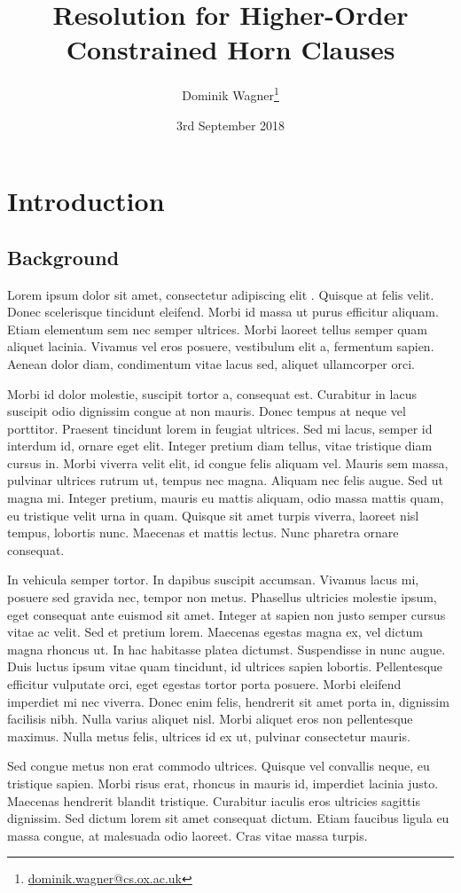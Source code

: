 \documentclass[a4paper,twoside,notitlepage,openright,11pt]{report}
\title{Resolution for Higher-Order\\Constrained Horn Clauses}
\author{Dominik Wagner\ifdraft\thanks{\href{mailto:dominik.wagner@cs.ox.ac.uk}{dominik.wagner@cs.ox.ac.uk}}\else\fi}
\date{3rd September 2018}
\begin{document}


\chapter{Introduction}
\section{Background}
\label{sec:background}


Lorem ipsum dolor sit amet, consectetur adipiscing elit \cite{C45}. Quisque at felis velit. Donec scelerisque tincidunt eleifend. Morbi id massa ut purus efficitur aliquam. Etiam elementum sem nec semper ultrices. Morbi laoreet tellus semper quam aliquet lacinia. Vivamus vel eros posuere, vestibulum elit a, fermentum sapien. Aenean dolor diam, condimentum vitae lacus sed, aliquet ullamcorper orci.

Morbi id dolor molestie, suscipit tortor a, consequat est. Curabitur in lacus suscipit odio dignissim congue at non mauris. Donec tempus at neque vel porttitor. Praesent tincidunt lorem in feugiat ultrices. Sed mi lacus, semper id interdum id, ornare eget elit. Integer pretium diam tellus, vitae tristique diam cursus in. Morbi viverra velit elit, id congue felis aliquam vel. Mauris sem massa, pulvinar ultrices rutrum ut, tempus nec magna. Aliquam nec felis augue. Sed ut magna mi. Integer pretium, mauris eu mattis aliquam, odio massa mattis quam, eu tristique velit urna in quam. Quisque sit amet turpis viverra, laoreet nisl tempus, lobortis nunc. Maecenas et mattis lectus. Nunc pharetra ornare consequat.

In vehicula semper tortor. In dapibus suscipit accumsan. Vivamus lacus mi, posuere sed gravida nec, tempor non metus. Phasellus ultricies molestie ipsum, eget consequat ante euismod sit amet. Integer at sapien non justo semper cursus vitae ac velit. Sed et pretium lorem. Maecenas egestas magna ex, vel dictum magna rhoncus ut. In hac habitasse platea dictumst. Suspendisse in nunc augue. Duis luctus ipsum vitae quam tincidunt, id ultrices sapien lobortis. Pellentesque efficitur vulputate orci, eget egestas tortor porta posuere. Morbi eleifend imperdiet mi nec viverra. Donec enim felis, hendrerit sit amet porta in, dignissim facilisis nibh. Nulla varius aliquet nisl. Morbi aliquet eros non pellentesque maximus. Nulla metus felis, ultrices id ex ut, pulvinar consectetur mauris.

Sed congue metus non erat commodo ultrices. Quisque vel convallis neque, eu tristique sapien. Morbi risus erat, rhoncus in mauris id, imperdiet lacinia justo. Maecenas hendrerit blandit tristique. Curabitur iaculis eros ultricies sagittis dignissim. Sed dictum lorem sit amet consequat dictum. Etiam faucibus ligula eu massa congue, at malesuada odio laoreet. Cras vitae massa turpis.
\end{document}
